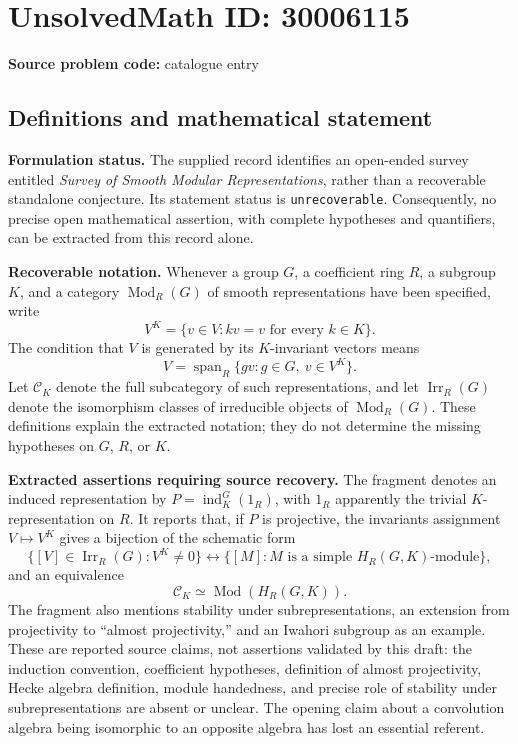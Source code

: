 \documentclass[11pt]{article}
\begin{document}
\section*{UnsolvedMath ID: 30006115}
\textbf{Source problem code:} catalogue entry
\subsection{Definitions and mathematical statement}
\textbf{Formulation status.} The supplied record identifies an open-ended survey entitled \emph{Survey of Smooth Modular Representations}, rather than a recoverable standalone conjecture. Its statement status is \texttt{unrecoverable}. Consequently, no precise open mathematical assertion, with complete hypotheses and quantifiers, can be extracted from this record alone.

\textbf{Recoverable notation.} Whenever a group \(G\), a coefficient ring \(R\), a subgroup \(K\), and a category \(\operatorname{Mod}_R(G)\) of smooth representations have been specified, write
\[
V^K=\{v\in V:kv=v\text{ for every }k\in K\}.
\]
The condition that \(V\) is generated by its \(K\)-invariant vectors means
\[
V=\operatorname{span}_R\{gv:g\in G,\ v\in V^K\}.
\]
Let \(\mathcal C_K\) denote the full subcategory of such representations, and let \(\operatorname{Irr}_R(G)\) denote the isomorphism classes of irreducible objects of \(\operatorname{Mod}_R(G)\). These definitions explain the extracted notation; they do not determine the missing hypotheses on \(G\), \(R\), or \(K\).

\textbf{Extracted assertions requiring source recovery.} The fragment denotes an induced representation by \(P=\operatorname{ind}_K^G(1_R)\), with \(1_R\) apparently the trivial \(K\)-representation on \(R\). It reports that, if \(P\) is projective, the invariants assignment \(V\mapsto V^K\) gives a bijection of the schematic form
\[
\{[V]\in\operatorname{Irr}_R(G):V^K\ne0\}
\longleftrightarrow
\{[M]:M\text{ is a simple }H_R(G,K)\text{-module}\},
\]
and an equivalence
\[
\mathcal C_K\simeq\operatorname{Mod}(H_R(G,K)).
\]
The fragment also mentions stability under subrepresentations, an extension from projectivity to ``almost projectivity,'' and an Iwahori subgroup as an example. These are reported source claims, not assertions validated by this draft: the induction convention, coefficient hypotheses, definition of almost projectivity, Hecke algebra definition, module handedness, and precise role of stability under subrepresentations are absent or unclear. The opening claim about a convolution algebra being isomorphic to an opposite algebra has lost an essential referent.
\end{document}
